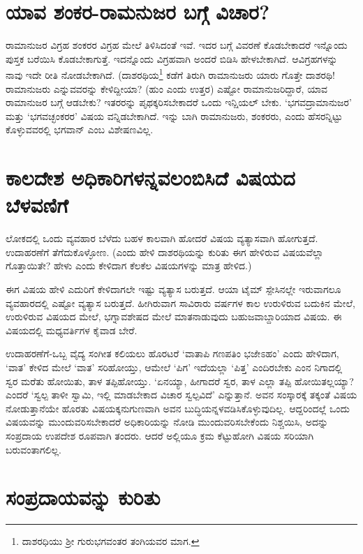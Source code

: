 \section*{ಯಾವ ಶಂಕರ-ರಾಮನುಜರ ಬಗ್ಗೆ ವಿಚಾರ?}

ರಾಮಾನುಜರ ವಿಗ್ರಹ ಶಂಕರರ ವಿಗ್ರಹ ಮೇಲೆ ತಿಳಿಸಿದಂತೆ ಇವೆ. ಇದರ ಬಗ್ಗೆ ವಿವರಣೆ ಕೊಡಬೇಕಾದರೆ ಇನ್ನೊಂದು ಪುಸ್ತಕ ಬರೆಯಿಸಿ ಕೊಡಬೇಕಾಗುತ್ತೆ. ಇದನ್ನೊಂದು ವಿಗ್ರಹವಾಗಿ ಅಂದರೆ ಬಿಡಿಸಿ ಹೇಳಬೇಕಾಗಿದೆ. ಆವಿಗ್ರಹಗಳನ್ನು ನಾವು ಇದೇ ರೀತಿ ನೋಡಬೇಕಾಗಿದೆ. (ದಾಶರಥಿಯ\footnote{ದಾಶರಧಿಯು ಶ್ರೀ ಗುರುಭಗವಂತರ ತಂಗಿಯವರ ಮಾಗ.} ಕಡೆಗೆ ತಿರುಗಿ ರಾಮಾನುಜರು ಯಾರು ಗೊತ್ತೇ ದಾಶರಥಿ! ರಾಮಾನುಜರು ಎನ್ನುವವರನ್ನು ಕೇಳಿದ್ದೀಯಾ? (ಹುಂ ಎಂದು ಉತ್ತರ) ಎಷ್ಟೋ ರಾಮಾನುಜರಿದ್ದಾರೆ, ಯಾವ ರಾಮಾನುಜರ ಬಗ್ಗೆ ಆಡಬೇಕು? ಇತರರನ್ನು  ಪೃಥಕ್ಕರಿಸಬೇಕಾದರೆ ಒಂದು ಇನ್ಷಿಯಲ್ ಬೇಕು. `ಭಗವದ್ರಾಮಾನುಜರ' ಮತ್ತು `ಭಗವಚ್ಛಂಕರರ' ವಿಷಯ ವನ್ನಿಡಬೇಕಾಗಿದೆ. ಇನ್ನು ಬಾಗಿ ರಾಮಾನುಜರು, ಶಂಕರರು, ಎಂದು ಹೆಸರನ್ನಿಟ್ಟು ಕೊಳ್ಳುವವರಲ್ಲಿ ಭಗವಾನ್ ಎಂಬ ವಿಶೇಷಣವಿಲ್ಲ.

\section*{ಕಾಲದೇಶ ಅಧಿಕಾರಿಗಳನ್ನವಲಂಬಿಸಿದೆ ವಿಷಯದ ಬೆಳವಣಿಗೆ}

ಲೋಕದಲ್ಲಿ ಒಂದು ವ್ಯವಹಾರ ಬೆಳೆದು ಬಹಳ ಕಾಲವಾಗಿ ಹೋದರೆ ವಿಷಯ ವ್ಯತ್ಯಾಸವಾಗಿ ಹೋಗುತ್ತದೆ. ಉದಾಹರಣೆಗೆ ತೆಗೆದುಕೊಳ್ಳೋಣ. (ಎಂದು ಹೇಳಿ ದಾಶರಥಿಯನ್ನು ಕುರಿತು ಈಗ ಹೇಳಿರುವ ವಿಷಯವೆಲ್ಲಾ ಗೊತ್ತಾಯಿತೇ? ಹೇಳು ಎಂದು ಕೇಳಿದಾಗ ಕೆಲಕೆಲ ವಿಷಯಗಳನ್ನು ಮಾತ್ರ ಹೇಳಿದ.)

ಈಗ ವಿಷಯ ಹೇಳಿ ಎದುರಿಗೆ ಕೇಳಿದಾಗಲೇ ಇಷ್ಟು  ವ್ಯತ್ಯಾಸ ಬರುತ್ತದೆ. ಆಯಾ ಟೈಮ್ ಸ್ಪೇಸಿನಲ್ಲೇ ಇರುವಾಗಲೂ ವ್ಯವಹಾರದಲ್ಲಿ ಎಷ್ಟೋ ವ್ಯತ್ಯಾಸ ಬರುತ್ತದೆ. ಹೀಗಿರುವಾಗ ಸಾವಿರಾರು ವರ್ಷಗಳ ಕಾಲ ಉರುಳಿರುವ ಬದುಕಿನ ಮೇಲೆ, ಉರುಳಿರುವ ವಿಷಯದ ಮೇಲೆ, ಭಗ್ನಾವಶೇಷದ ಮೇಲೆ ಮಾತನಾಡುವುದು ಬಹುಜವಾಬ್ದಾರಿಯಾದ ವಿಷಯ. ಈ ವಿಷಯದಲ್ಲಿ ಮಧ್ಯವರ್ತಿಗಳ ಕೈವಾಡ ಬೇರೆ.

ಉದಾಹರಣೆಗೆ-ಒಬ್ಬ ವೈದ್ಯ ಸಂಗೀತ ಕಲಿಯಲು ಹೊರಟರೆ `ವಾತಾಪಿ ಗಣಪತಿಂ ಭಜೇಽಹಂ' ಎಂದು ಹೇಳಿದಾಗ, `ವಾತ' ಕೇಳಿದ ಮೇಲೆ `ವಾತ' ಸರಿಹೋಯ್ತು, ಆಮೇಲೆ  `ಪಿಗ' ಇದೆಯಲ್ಲಾ `ಪಿತ್ತ' ಎಂದಿರಬೇಕು ಎಂನ ನಿಗಾದಲ್ಲಿ ಸ್ವರ ಮರೆತು ಹೋಯಿತು, ತಾಳ ತಪ್ಪಿಹೋಯ್ತು. `ಏನಯ್ಯಾ, ಹೀಗಾದರೆ ಸ್ವರ, ತಾಳ ಎಲ್ಲಾ ತಪ್ಪಿ ಹೋಯಿತಲ್ಲಯ್ಯಾ? ಎಂದರೆ `ಸ್ವಲ್ಪ ತಾಳೀ ಸ್ವಾಮಿ, ಇಲ್ಲಿ ಮಾಡಬೇಕಾದ ವಿಚಾರ ಸ್ವಲ್ಪವಿದೆ' ಎನ್ನುತ್ತಾನೆ. ಅವನ ಸಂಸ್ಕಾರಕ್ಕೆ ತಕ್ಕಂತೆ ವಿಷಯ ನೋಡುತ್ತಾನೆಯೇ ಹೊರತು ವಿಷಯಕ್ಕನುಗುಣವಾಗಿ ಅವನ ಬುದ್ಧಿಯನ್ನಳವಡಿಸಿಕೊಳ್ಳುವುದಿಲ್ಲ. ಆದ್ದರಿಂದಲ್ಲೆ ಒಂದು ವಿಷಯವನ್ನು ಮುಂದುವರಿಸಬೇಕಾದರೆ ಅಧಿಕಾರಿಯನ್ನು ನೋಡಿ ಮುಂದುವರಿಸಬೇಕೆಂದು ನಿಶ್ಚಯಿಸಿ, ಅದನ್ನು ಸಂಪ್ರದಾಯ ಉಪದೇಶ ರೂಪವಾಗಿ ತಂದರು. ಆದರೆ ಅಲ್ಲಿಯೂ ಕ್ರಮ ಕೆಟ್ಟುಹೋಗಿ ವಿಷಯ ಸರಿಯಾಗಿ ಬರುವಂತಾಗಲಿಲ್ಲ. 

\section*{ಸಂಪ್ರದಾಯವನ್ನು ಕುರಿತು}
 
